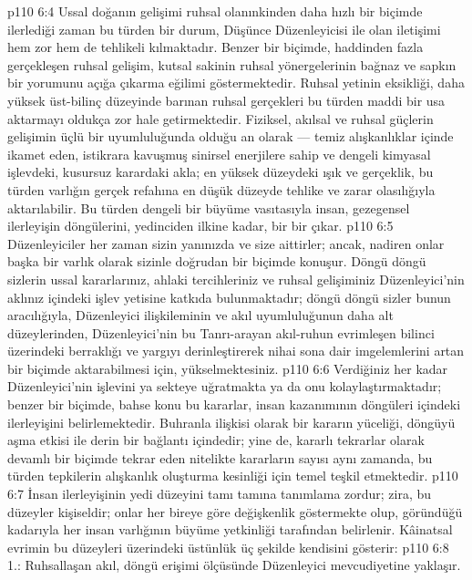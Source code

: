 \vs p110 6:4 Ussal doğanın gelişimi ruhsal olanınkinden daha hızlı bir biçimde ilerlediği zaman bu türden bir durum, Düşünce Düzenleyicisi ile olan iletişimi hem zor hem de tehlikeli kılmaktadır. Benzer bir biçimde, haddinden fazla gerçekleşen ruhsal gelişim, kutsal sakinin ruhsal yönergelerinin bağnaz ve sapkın bir yorumunu açığa çıkarma eğilimi göstermektedir. Ruhsal yetinin eksikliği, daha yüksek üst\hyp{}bilinç düzeyinde barınan ruhsal gerçekleri bu türden maddi bir usa aktarmayı oldukça zor hale getirmektedir. Fiziksel, akılsal ve ruhsal güçlerin gelişimin üçlü bir uyumluluğunda olduğu an olarak --- temiz alışkanlıklar içinde ikamet eden, istikrara kavuşmuş sinirsel enerjilere sahip ve dengeli kimyasal işlevdeki, kusursuz karardaki akla; en yüksek düzeydeki ışık ve gerçeklik, bu türden varlığın gerçek refahına en düşük düzeyde tehlike ve zarar olasılığıyla aktarılabilir. Bu türden dengeli bir büyüme vasıtasıyla insan, gezegensel ilerleyişin döngülerini, yedinciden ilkine kadar, bir bir çıkar.
\vs p110 6:5 Düzenleyiciler her zaman sizin yanınızda ve size aittirler; ancak, nadiren onlar başka bir varlık olarak sizinle doğrudan bir biçimde konuşur. Döngü döngü sizlerin ussal kararlarınız, ahlaki tercihleriniz ve ruhsal gelişiminiz Düzenleyici’nin aklınız içindeki işlev yetisine katkıda bulunmaktadır; döngü döngü sizler bunun aracılığıyla, Düzenleyici ilişkileminin ve akıl uyumluluğunun daha alt düzeylerinden, Düzenleyici’nin bu Tanrı\hyp{}arayan akıl\hyp{}ruhun evrimleşen bilinci üzerindeki berraklığı ve yargıyı derinleştirerek nihai sona dair imgelemlerini artan bir biçimde aktarabilmesi için, yükselmektesiniz.
\vs p110 6:6 Verdiğiniz her kadar Düzenleyici’nin işlevini ya sekteye uğratmakta ya da onu kolaylaştırmaktadır; benzer bir biçimde, bahse konu bu kararlar, insan kazanımının döngüleri içindeki ilerleyişini belirlemektedir. Buhranla ilişkisi olarak bir kararın yüceliği, döngüyü aşma etkisi ile derin bir bağlantı içindedir; yine de, kararlı tekrarlar olarak devamlı bir biçimde tekrar eden nitelikte kararların sayısı aynı zamanda, bu türden tepkilerin alışkanlık oluşturma kesinliği için temel teşkil etmektedir.
\vs p110 6:7 İnsan ilerleyişinin yedi düzeyini tamı tamına tanımlama zordur; zira, bu düzeyler kişiseldir; onlar her bireye göre değişkenlik göstermekte olup, göründüğü kadarıyla her insan varlığının büyüme yetkinliği tarafından belirlenir. Kâinatsal evrimin bu düzeyleri üzerindeki üstünlük üç şekilde kendisini gösterir:
\vs p110 6:8 1.\bibnobreakspace {}: Ruhsallaşan akıl, döngü erişimi ölçüsünde Düzenleyici mevcudiyetine yaklaşır.
